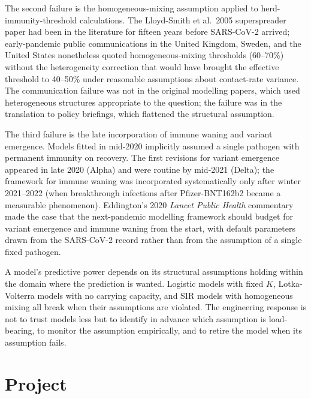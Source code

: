 The second failure is the homogeneous-mixing assumption applied to
herd-immunity-threshold calculations. The Lloyd-Smith et al.\ 2005
superspreader paper had been in the literature for fifteen years
before SARS-CoV-2 arrived; early-pandemic public communications in
the United Kingdom, Sweden, and the United States nonetheless quoted
homogeneous-mixing thresholds (60--70\%) without the heterogeneity
correction that would have brought the effective threshold to
40--50\% under reasonable assumptions about contact-rate variance.
The communication failure was not in the original modelling papers,
which used heterogeneous structures appropriate to the question;
the failure was in the translation to policy briefings, which
flattened the structural assumption.

The third failure is the late incorporation of immune waning and
variant emergence. Models fitted in mid-2020 implicitly assumed a
single pathogen with permanent immunity on recovery. The first
revisions for variant emergence appeared in late 2020 (Alpha) and
were routine by mid-2021 (Delta); the framework for immune waning
was incorporated systematically only after winter 2021--2022 (when
breakthrough infections after Pfizer-BNT162b2 became a measurable
phenomenon). Eddington's 2020 \emph{Lancet Public Health}
commentary \cite[pp.~e379--e380]{paper:v6c08-eddington-lancet-2020}
made the case that the next-pandemic modelling framework should
budget for variant emergence and immune waning from the start, with
default parameters drawn from the SARS-CoV-2 record rather than
from the assumption of a single fixed pathogen.

\begin{principle}
A model's predictive power depends on its structural assumptions
holding within the domain where the prediction is wanted. Logistic
models with fixed $K$, Lotka-Volterra models with no carrying
capacity, and SIR models with homogeneous mixing all break when
their assumptions are violated. The engineering response is not to
trust models less but to identify in advance which assumption is
load-bearing, to monitor the assumption empirically, and to retire
the model when its assumption fails.
\end{principle}

\section{Project}

